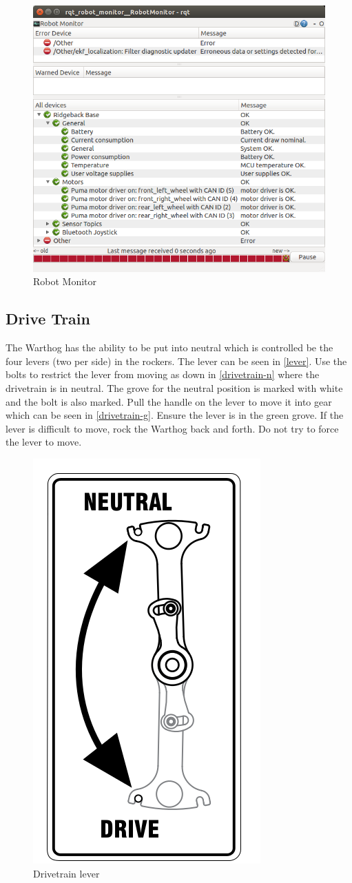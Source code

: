 \documentclass[]{clearpath-latex/clearpath-manual}
\begin{document}
\begin{figure}[!htb]
  \centering
  \includegraphics[width=0.75\linewidth]{rqt_robot_monitor.png}
  \caption{Robot Monitor}
  \label{robotmonitor}
\end{figure}


\subsection{Drive Train}

The Warthog has the ability to be put into neutral which is controlled be the four levers (two per side) in the rockers.  The lever can be seen in \autoref{lever}.  Use the bolts to restrict the lever from moving as down in \autoref{drivetrain-n} where the drivetrain is in neutral.  The grove for the neutral position is marked with white and the bolt is also marked.  Pull the handle on the lever to move it into gear which can be seen in \autoref{drivetrain-g}.  Ensure the lever is in the green grove.  If the lever is difficult to move, rock the Warthog back and forth.  Do not try to force the lever to move.

\begin{figure}[!htb]
  \centering
  \includegraphics[width=0.25\linewidth]{drivetrain.png}
  \caption{Drivetrain lever}
  \label{lever}
\end{figure}
\end{document}
